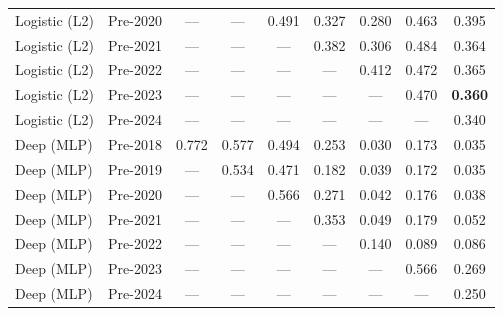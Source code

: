 \begin{table}[htbp]
{\begin{tabular}{l lccccccc}
Logistic (L2) & Pre-2020 & --- & --- & 0.491 & 0.327 & 0.280 & 0.463 & 0.395 \\
Logistic (L2) & Pre-2021 & --- & --- & --- & 0.382 & 0.306 & 0.484 & 0.364 \\
Logistic (L2) & Pre-2022 & --- & --- & --- & --- & 0.412 & 0.472 & 0.365 \\
Logistic (L2) & Pre-2023 & --- & --- & --- & --- & --- & 0.470 & \textbf{0.360} \\
Logistic (L2) & Pre-2024 & --- & --- & --- & --- & --- & --- & 0.340 \\
Deep (MLP) & Pre-2018 & 0.772 & 0.577 & 0.494 & 0.253 & 0.030 & 0.173 & 0.035 \\
Deep (MLP) & Pre-2019 & --- & 0.534 & 0.471 & 0.182 & 0.039 & 0.172 & 0.035 \\
Deep (MLP) & Pre-2020 & --- & --- & 0.566 & 0.271 & 0.042 & 0.176 & 0.038 \\
Deep (MLP) & Pre-2021 & --- & --- & --- & 0.353 & 0.049 & 0.179 & 0.052 \\
Deep (MLP) & Pre-2022 & --- & --- & --- & --- & 0.140 & 0.089 & 0.086 \\
Deep (MLP) & Pre-2023 & --- & --- & --- & --- & --- & 0.566 & 0.269 \\
Deep (MLP) & Pre-2024 & --- & --- & --- & --- & --- & --- & 0.250 \\
\bottomrule
\end{tabular}%
}
\end{table}